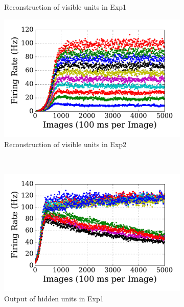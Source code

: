 \begin{figure}
\begin{subfigure}[t]{0.48\textwidth}
		\caption{Reconstruction of visible units in Exp1}
	\end{subfigure}
	\begin{subfigure}[t]{0.48\textwidth}
		\includegraphics[width=\textwidth]{pics_sdlm/13_exp_SRBM_noise_long/exp2_recon_s.pdf}
		\caption{Reconstruction of visible units in Exp2}
	\end{subfigure}\\
	\begin{subfigure}[t]{0.48\textwidth}
		\includegraphics[width=\textwidth]{pics_sdlm/13_exp_SRBM_noise_long/exp1_hid_s.pdf}
		\caption{Output of hidden units in Exp1}
	\end{subfigure}
	\begin{subfigure}[t]{0.48\textwidth}

\end{subfigure}
\end{figure}
